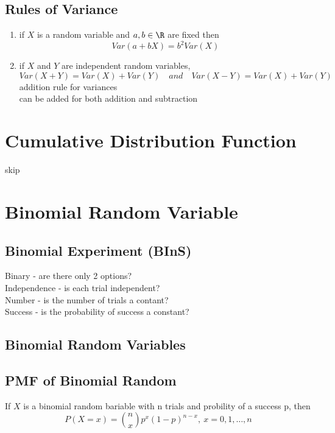 \subsection{Rules of Variance}  %
\begin{enumerate}
    \item if $X$ is a random variable and $a, b\in\R$ are fixed then
    \begin{equation}
        Var(a+bX)=b^2 Var(X)
    \end{equation}
    \item if $X$ and $Y$ are independent random variables,
    \begin{equation}
        Var(X+Y)=Var(X)+Var(Y)\quad and\quad Var(X-Y)=Var(X)+Var(Y)
    \end{equation}
    addition rule for variances \\
    can be added for both addition and subtraction \\
\end{enumerate}

\section{Cumulative Distribution Function}  %
skip

\section{Binomial Random Variable}  %
\subsection{Binomial Experiment (BInS)}  %
Binary - are there only 2 options? \\
Independence - is each trial independent? \\
Number - is the number of trials a contant? \\
Success - is the probability of success a constant?
\subsection{Binomial Random Variables}  %

\subsection{PMF of Binomial Random }  %
If $X$ is a binomial random bariable with n trials and probility of a success p, then
\begin{equation}
    P(X=x)=\binom{n}{x}p^x(1-p)^{n-x},\ x=0,1,\ldots, n
\end{equation}

